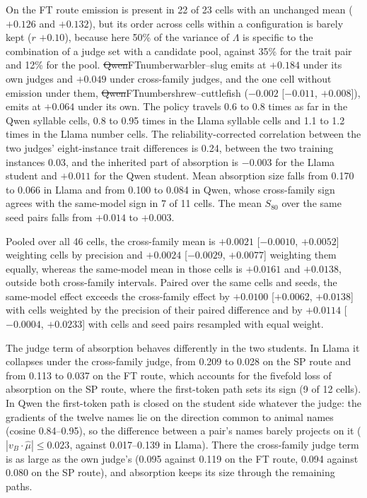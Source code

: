 On the FT route emission is present in 22 of 23 cells with an unchanged mean ($+0.126$ and $+0.132$), but its order across cells within a configuration is barely kept ($r$ $+0.10$), because here 50\% of the variance of $\Lambda$ is specific to the combination of a judge set with a candidate pool, against 35\% for the trait pair and 12\% for the pool. \st{Qwen}{FT}{number}{warbler--slug} emits at $+0.184$ under its own judges and $+0.049$ under cross-family judges, and the one cell without emission under them, \st{Qwen}{FT}{number}{shrew--cuttlefish} ($-0.002$ [$-0.011$, $+0.008$]), emits at $+0.064$ under its own. The policy travels 0.6 to 0.8 times as far in the Qwen syllable cells, 0.8 to 0.95 times in the Llama syllable cells and 1.1 to 1.2 times in the Llama number cells. The reliability-corrected correlation between the two judges' eight-instance trait differences is 0.24, between the two training instances 0.03, and the inherited part of absorption is $-0.003$ for the Llama student and $+0.011$ for the Qwen student. Mean absorption size falls from 0.170 to 0.066 in Llama and from 0.100 to 0.084 in Qwen, whose cross-family sign agrees with the same-model sign in 7 of 11 cells. The mean $S_{80}$ over the same seed pairs falls from $+0.014$ to $+0.003$.

Pooled over all 46 cells, the cross-family mean is $+0.0021$ [$-0.0010$, $+0.0052$] weighting cells by precision and $+0.0024$ [$-0.0029$, $+0.0077$] weighting them equally, whereas the same-model mean in those cells is $+0.0161$ and $+0.0138$, outside both cross-family intervals. Paired over the same cells and seeds, the same-model effect exceeds the cross-family effect by $+0.0100$ [$+0.0062$, $+0.0138$] with cells weighted by the precision of their paired difference and by $+0.0114$ [$-0.0004$, $+0.0233$] with cells and seed pairs resampled with equal weight.

The judge term of absorption behaves differently in the two students. In Llama it collapses under the cross-family judge, from 0.209 to 0.028 on the SP route and from 0.113 to 0.037 on the FT route, which accounts for the fivefold loss of absorption on the SP route, where the first-token path sets its sign (9 of 12 cells). In Qwen the first-token path is closed on the student side whatever the judge: the gradients of the twelve names lie on the direction common to animal names (cosine 0.84--0.95), so the difference between a pair's names barely projects on it ($|v_B\cdot\hat\mu|\leq0.023$, against 0.017--0.139 in Llama). There the cross-family judge term is as large as the own judge's (0.095 against 0.119 on the FT route, 0.094 against 0.080 on the SP route), and absorption keeps its size through the remaining paths.

